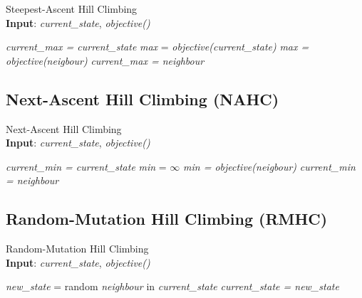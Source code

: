 \documentclass[12pt,twoside]{article}
\begin{document}
	\begin{algorithm}[H]
		\caption{Steepest-Ascent Hill Climbing\\ \textbf{Input}: \textit{current\_state}, \textit{objective()}}
		\begin{algorithmic}[1]
			\State \textit{current\_max = current\_state}
			\State \textit{max} = \textit{objective(current\_state)}
			\State	\textit{max = objective(neigbour)}
			\State	\textit{current\_max = neighbour}
			\EndIf
			\EndFor\\
		\end{algorithmic}
		\label{alg:sahc}
	\end{algorithm}
		
	\subsection{Next-Ascent Hill Climbing (NAHC)}
	
	\begin{algorithm}[H]
		\caption{Next-Ascent Hill Climbing\\ \textbf{Input}: \textit{current\_state}, \textit{objective()}}
		\begin{algorithmic}[1]
			\State \textit{current\_min = current\_state}
			\State \textit{min} = $\infty$
			\State	\textit{min = objective(neigbour)}
			\State	\textit{current\_min = neighbour}
			\EndIf
			\EndFor\\
		\end{algorithmic}
		\label{alg:nahc}
	\end{algorithm}
	
	\subsection{Random-Mutation Hill Climbing (RMHC)}
	
	\begin{algorithm}[H]
		\caption{Random-Mutation Hill Climbing\\ \textbf{Input}: \textit{current\_state}, \textit{objective()}}
		\begin{algorithmic}[1]
			\State \textit{new\_state} = random \textit{neighbour} in \textit{current\_state}
			\State	\textit{current\_state = new\_state}
			\EndIf \\
		\end{algorithmic}
		\label{alg:rmhc}
	\end{algorithm}
	
\end{document}
